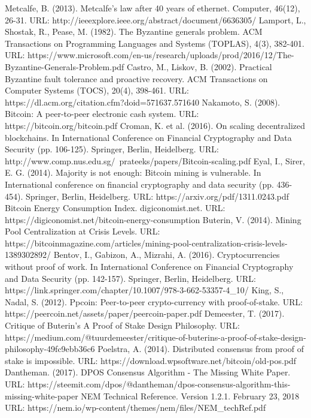 \documentclass[a4paper,12pt]{article}
\begin{document}
\begin{thebibliography}{99}
  Metcalfe, B. (2013). Metcalfe's law after 40 years of ethernet. Computer, 46(12), 26-31. URL: http://ieeexplore.ieee.org/abstract/document/6636305/
  Lamport, L., Shostak, R., Pease, M. (1982). The Byzantine generals problem. ACM Transactions on Programming Languages and Systems (TOPLAS), 4(3), 382-401. URL: https://www.microsoft.com/en-us/research/uploads/prod/2016/12/The-Byzantine-Generals-Problem.pdf
  Castro, M., Liskov, B. (2002). Practical Byzantine fault tolerance and proactive recovery. ACM Transactions on Computer Systems (TOCS), 20(4), 398-461. URL: https://dl.acm.org/citation.cfm?doid=571637.571640
  Nakamoto, S. (2008). Bitcoin: A peer-to-peer electronic cash system. URL: https://bitcoin.org/bitcoin.pdf
  Croman, K. et al. (2016). On scaling decentralized blockchains. In International Conference on Financial Cryptography and Data Security (pp. 106-125). Springer, Berlin, Heidelberg. URL: http://www.comp.nus.edu.sg/~prateeks/papers/Bitcoin-scaling.pdf
  Eyal, I., Sirer, E. G. (2014). Majority is not enough: Bitcoin mining is vulnerable. In International conference on financial cryptography and data security (pp. 436-454). Springer, Berlin, Heidelberg. URL: https://arxiv.org/pdf/1311.0243.pdf
  Bitcoin Energy Consumption Index. digiconomist.net. URL: https://digiconomist.net/bitcoin-energy-consumption
  Buterin, V. (2014). Mining Pool Centralization at Crisis Levels. URL: https://bitcoinmagazine.com/articles/mining-pool-centralization-crisis-levels-1389302892/
  Bentov, I., Gabizon, A., Mizrahi, A. (2016). Cryptocurrencies without proof of work. In International Conference on Financial Cryptography and Data Security (pp. 142-157). Springer, Berlin, Heidelberg. URL: https://link.springer.com/chapter/10.1007/978-3-662-53357-4\_10/
  King, S., Nadal, S. (2012). Ppcoin: Peer-to-peer crypto-currency with proof-of-stake. URL: https://peercoin.net/assets/paper/peercoin-paper.pdf
  Demeester, T. (2017). Critique of Buterin’s A Proof of Stake Design Philosophy. URL: https://medium.com/@tuurdemeester/critique-of-buterins-a-proof-of-stake-design-philosophy-49fc9ebb36c6
  Poelstra, A. (2014). Distributed consensus from proof of stake is impossible. URL: https://download.wpsoftware.net/bitcoin/old-pos.pdf
  Dantheman. (2017). DPOS Consensus Algorithm - The Missing White Paper. URL: https://steemit.com/dpos/@dantheman/dpos-consensus-algorithm-this-missing-white-paper
  NEM Technical Reference. Version 1.2.1. February 23, 2018 URL: https://nem.io/wp-content/themes/nem/files/NEM\_techRef.pdf
\end{thebibliography}


\tableofcontents
\end{document}
